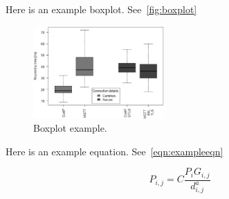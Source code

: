Here is an example boxplot. See~\cref{fig:boxplot}

\begin{figure}
  \includegraphics[width=5cm]{Figures/graph3.png}
  \caption{Boxplot example.}\label{fig:line}
\end{figure}

Here is an example equation. See~\cref{eqn:exampleeqn}

\begin{equation}
  P_{i,j} = C\frac{P_iG_{i,j}}{d^a_{i,j}}
\end{equation}
